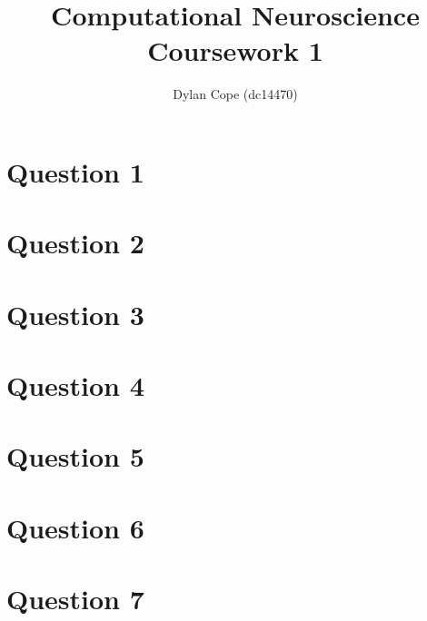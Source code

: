 \documentclass[12pt, a4paper]{article}
\title{Computational Neuroscience Coursework 1}
\author{Dylan Cope (dc14470)}
\date{}
\begin{document}
\nocite{*}


\maketitle

\section*{Question 1}

\section*{Question 2}

\section*{Question 3}

\section*{Question 4}

\section*{Question 5}

\section*{Question 6}

\section*{Question 7}


\bibdata
\end{document}

